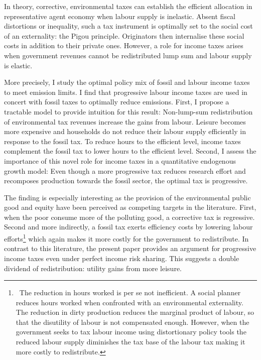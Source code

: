 In theory, corrective, environmental taxes can establish the efficient allocation in  representative agent economy when labour supply is inelastic. Absent fiscal distortions or inequality, such a tax instrument is optimally set to the social cost of an externality: the Pigou principle. Originators then internalise these social costs in addition to their private ones. However, a role for income taxes arises when government revenues cannot be redistributed lump sum and labour supply is elastic.

More precisely, I study the optimal policy mix of fossil and labour income taxes to meet emission limits. 
I find that progressive labour income taxes are used in concert with fossil taxes to optimally reduce emissions. 
 First, I propose a tractable model to provide intuition for this result: Non-lump-sum redistribution of environmental tax revenues increase the gains from labour. Leisure becomes more expensive and households do not reduce their labour supply efficiently in response to the fossil tax. To reduce hours to the efficient level, income taxes complement the fossil tax to lower hours to the efficient level.  
Second, I assess the importance of this novel role for income taxes in a quantitative endogenous growth model:
Even though a more progressive tax reduces research effort  and recomposes production towards the fossil sector, the optimal tax is progressive. 

The finding is especially interesting as the provision of the environmental public good and equity have been perceived as competing targets in the literature. First, when the poor consume more of the polluting good, a corrective tax is regressive. Second and more indirectly, a fossil tax exerts efficiency costs by lowering labour efforts\footnote{\ The reduction in hours worked is per se not inefficient. A social planner reduces hours worked when confronted with an environmental externality. The reduction in dirty production reduces the marginal product of labour, so that the disutility of labour is not compensated enough. However, when the government seeks to tax labour income using distortionary policy tools the reduced labour supply diminishes the tax base of the labour tax making it more costly to redistribute.} which again makes it more costly for the government to redistribute. 
In contrast to this literature, the present paper provides an argument for progressive income taxes even under perfect income risk sharing. This suggests a double dividend of redistribution: utility gains from more leisure.

